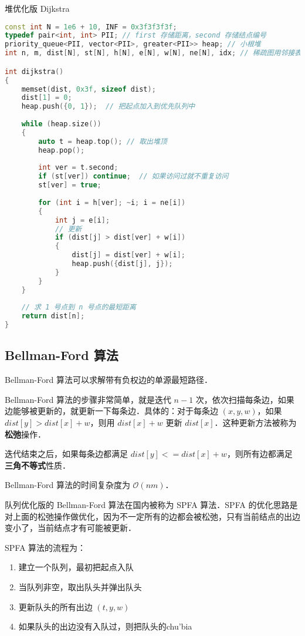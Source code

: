 堆优化版 Dijkstra

\begin{lstlisting}[language=cpp]
const int N = 1e6 + 10, INF = 0x3f3f3f3f;
typedef pair<int, int> PII; // first 存储距离，second 存储结点编号
priority_queue<PII, vector<PII>, greater<PII>> heap; // 小根堆
int n, m, dist[N], st[N], h[N], e[N], w[N], ne[N], idx; // 稀疏图用邻接表存图

int dijkstra()
{
    memset(dist, 0x3f, sizeof dist);
    dist[1] = 0;
    heap.push({0, 1});  // 把起点加入到优先队列中
    
    while (heap.size())
    {
        auto t = heap.top(); // 取出堆顶
        heap.pop();
        
        int ver = t.second;
        if (st[ver]) continue;  // 如果访问过就不重复访问
        st[ver] = true;
        
        for (int i = h[ver]; ~i; i = ne[i])
        {
            int j = e[i];
            // 更新
            if (dist[j] > dist[ver] + w[i])
            {
                dist[j] = dist[ver] + w[i];
                heap.push({dist[j], j});
            }
        }
    }
    
    // 求 1 号点到 n 号点的最短距离
    return dist[n];
}
\end{lstlisting}

\subsection{Bellman-Ford 算法}

Bellman-Ford 算法可以求解带有负权边的单源最短路径．

Bellman-Ford 算法的步骤非常简单，就是迭代 $n - 1$ 次，依次扫描每条边，如果边能够被更新的，就更新一下每条边．具体的：对于每条边 $(x, y, w)$，如果 $dist[y] > dist[x] + w$，则用 $dist[x] + w$ 更新 $dist[x]$．这种更新方法被称为\textbf{松弛}操作．

迭代结束之后，如果每条边都满足 $dist[y] <= dist[x] + w$，则所有边都满足\textbf{三角不等式}性质．

Bellman-Ford 算法的时间复杂度为 $\mathcal{O}(nm)$．

队列优化版的 Bellman-Ford 算法在国内被称为 SPFA 算法．SPFA 的优化思路是对上面的松弛操作做优化，因为不一定所有的边都会被松弛，只有当前结点的出边变小了，当前结点才有可能被更新．

SPFA 算法的流程为：

\begin{enumerate}
\item 建立一个队列，最初把起点入队
\item 当队列非空，取出队头并弹出队头
\item 更新队头的所有出边 $(t, y, w)$
\item 如果队头的出边没有入队过，则把队头的chu'bia
\end{enumerate}